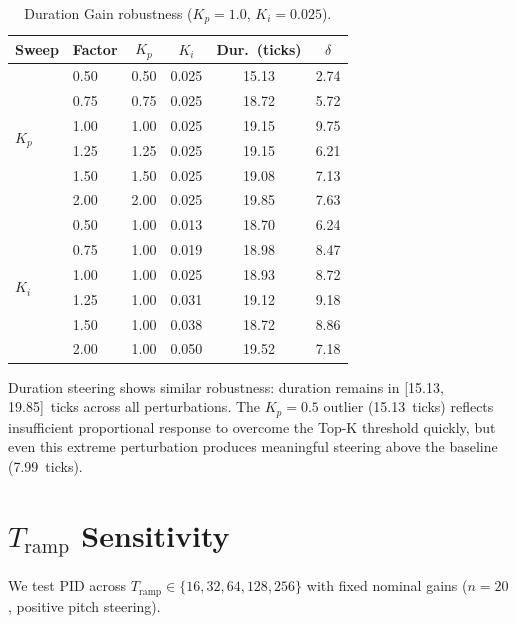 \documentclass{article}
\theoremstyle{plain}
\begin{document}
\begin{table}[h]
  \caption{Duration Gain robustness ($K_p{=}1.0$, $K_i{=}0.025$).}
  \label{tab:gain_dur}
  \begin{center}
  \begin{small}
  \begin{tabular}{llcccc}
    \toprule
    Sweep & Factor & $K_p$ & $K_i$ & Dur.\ (ticks) & $\delta$ \\
    \midrule
    \multirow{6}{*}{$K_p$} & 0.50 & 0.50 & 0.025 & 15.13 & 2.74 \\
    & 0.75 & 0.75 & 0.025 & 18.72 & 5.72 \\
    & 1.00 & 1.00 & 0.025 & 19.15 & 9.75 \\
    & 1.25 & 1.25 & 0.025 & 19.15 & 6.21 \\
    & 1.50 & 1.50 & 0.025 & 19.08 & 7.13 \\
    & 2.00 & 2.00 & 0.025 & 19.85 & 7.63 \\
    \midrule
    \multirow{6}{*}{$K_i$} & 0.50 & 1.00 & 0.013 & 18.70 & 6.24 \\
    & 0.75 & 1.00 & 0.019 & 18.98 & 8.47 \\
    & 1.00 & 1.00 & 0.025 & 18.93 & 8.72 \\
    & 1.25 & 1.00 & 0.031 & 19.12 & 9.18 \\
    & 1.50 & 1.00 & 0.038 & 18.72 & 8.86 \\
    & 2.00 & 1.00 & 0.050 & 19.52 & 7.18 \\
    \bottomrule
  \end{tabular}
  \end{small}
  \end{center}
\end{table}

Duration steering shows similar robustness: duration remains in [15.13, 19.85]~ticks across all perturbations. The $K_p{=}0.5$ outlier (15.13~ticks) reflects insufficient proportional response to overcome the Top-K threshold quickly, but even this extreme perturbation produces meaningful steering above the baseline (7.99~ticks).

\section{$T_\text{ramp}$ Sensitivity}
\label{app:tramp_sensitivity}

We test PID across $T_\text{ramp} \in \{16, 32, 64, 128, 256\}$ with fixed nominal gains ($n{=}20$, positive pitch steering).
\end{document}
